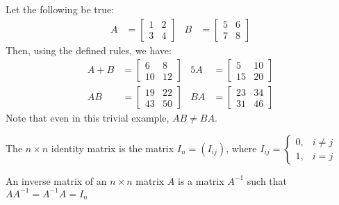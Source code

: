     \begin{example}
        Let the following be true:
        \begin{align*}
            A&=
            \begin{bmatrix}
                1&2\\
                3&4
            \end{bmatrix}
            &
            B&=
            \begin{bmatrix}
                5&6\\
                7&8
            \end{bmatrix}
        \end{align*}
        Then, using the defined rules, we have:
        \begin{align*}
            A+B&=
            \begin{bmatrix}
                6&8\\
                10&12
            \end{bmatrix}
            &
            5A&=
            \begin{bmatrix}
                5&10\\
                15&20
            \end{bmatrix}
            \\
            AB&=
            \begin{bmatrix}
                19&22\\
                43&50
            \end{bmatrix}
            &
            BA&=
            \begin{bmatrix}
                23&34\\
                31&46
            \end{bmatrix}
        \end{align*}
    Note that even in this trivial example,
    ${AB}\ne{BA}$.
    \end{example}
    \begin{definition}
        The ${n}\times{n}$ identity matrix is the matrix
        $I_{n}=(I_{ij})$, where
        $I_{ij}=%
        \begin{cases}%
         0,&{i}\ne{j}\\%
         1,&{i}={j}%
        \end{cases}$
    \end{definition}
    \begin{definition}
        An inverse matrix of an ${n}\times{n}$ matrix
        $A$ is a matrix $A^{-1}$ such that
        $AA^{-1}=A^{-1}A=I_{n}$
    \end{definition}
